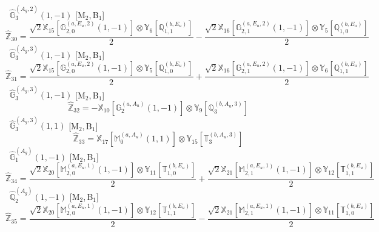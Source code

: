 \documentclass[fleqn,10pt,landscape]{article}
\begin{document}
\begin{itemize}
\begin{dmath*}
\end{dmath*}
\vspace{4mm}
\noindent {} $\,\,\,\hat{\mathbb{G}}_{3}^{(A_{g},2)}(1,-1)$ [M$_{2}$,\,B$_{1}$]
\begin{dmath*}
\hat{\mathbb{Z}}_{30}=\frac{\sqrt{2} \mathbb{X}_{15}[\mathbb{G}_{2,0}^{(a,E_{u},2)}(1,-1)] \otimes\mathbb{Y}_{6}[\mathbb{Q}_{1,1}^{(b,E_{u})}]}{2} - \frac{\sqrt{2} \mathbb{X}_{16}[\mathbb{G}_{2,1}^{(a,E_{u},2)}(1,-1)] \otimes\mathbb{Y}_{5}[\mathbb{Q}_{1,0}^{(b,E_{u})}]}{2}
\end{dmath*}
\vspace{4mm}
\noindent {} $\,\,\,\hat{\mathbb{G}}_{3}^{(A_{g},3)}(1,-1)$ [M$_{2}$,\,B$_{1}$]
\begin{dmath*}
\hat{\mathbb{Z}}_{31}=\frac{\sqrt{2} \mathbb{X}_{15}[\mathbb{G}_{2,0}^{(a,E_{u},2)}(1,-1)] \otimes\mathbb{Y}_{5}[\mathbb{Q}_{1,0}^{(b,E_{u})}]}{2} + \frac{\sqrt{2} \mathbb{X}_{16}[\mathbb{G}_{2,1}^{(a,E_{u},2)}(1,-1)] \otimes\mathbb{Y}_{6}[\mathbb{Q}_{1,1}^{(b,E_{u})}]}{2}
\end{dmath*}
\vspace{4mm}
\noindent {} $\,\,\,\hat{\mathbb{G}}_{3}^{(A_{g},3)}(1,-1)$ [M$_{2}$,\,B$_{1}$]
\begin{dmath*}
\hat{\mathbb{Z}}_{32}=- \mathbb{X}_{10}[\mathbb{G}_{2}^{(a,A_{u})}(1,-1)] \otimes\mathbb{Y}_{9}[\mathbb{Q}_{3}^{(b,A_{u},3)}]
\end{dmath*}
\vspace{4mm}
\noindent {} $\,\,\,\hat{\mathbb{G}}_{3}^{(A_{g},3)}(1,1)$ [M$_{2}$,\,B$_{1}$]
\begin{dmath*}
\hat{\mathbb{Z}}_{33}=\mathbb{X}_{17}[\mathbb{M}_{0}^{(a,A_{u})}(1,1)] \otimes\mathbb{Y}_{15}[\mathbb{T}_{3}^{(b,A_{u},3)}]
\end{dmath*}
\vspace{4mm}
\noindent {} $\,\,\,\hat{\mathbb{G}}_{1}^{(A_{g})}(1,-1)$ [M$_{2}$,\,B$_{1}$]
\begin{dmath*}
\hat{\mathbb{Z}}_{34}=\frac{\sqrt{2} \mathbb{X}_{20}[\mathbb{M}_{2,0}^{(a,E_{u},1)}(1,-1)] \otimes\mathbb{Y}_{11}[\mathbb{T}_{1,0}^{(b,E_{u})}]}{2} + \frac{\sqrt{2} \mathbb{X}_{21}[\mathbb{M}_{2,1}^{(a,E_{u},1)}(1,-1)] \otimes\mathbb{Y}_{12}[\mathbb{T}_{1,1}^{(b,E_{u})}]}{2}
\end{dmath*}
\vspace{4mm}
\noindent {} $\,\,\,\hat{\mathbb{Q}}_{2}^{(A_{g})}(1,-1)$ [M$_{2}$,\,B$_{1}$]
\begin{dmath*}
\hat{\mathbb{Z}}_{35}=\frac{\sqrt{2} \mathbb{X}_{20}[\mathbb{M}_{2,0}^{(a,E_{u},1)}(1,-1)] \otimes\mathbb{Y}_{12}[\mathbb{T}_{1,1}^{(b,E_{u})}]}{2} - \frac{\sqrt{2} \mathbb{X}_{21}[\mathbb{M}_{2,1}^{(a,E_{u},1)}(1,-1)] \otimes\mathbb{Y}_{11}[\mathbb{T}_{1,0}^{(b,E_{u})}]}{2}

\end{dmath*}
\end{itemize}
\end{document}
